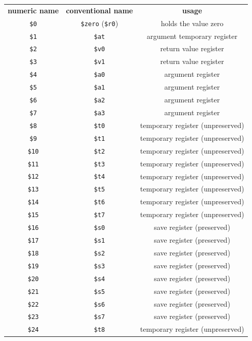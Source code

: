 \documentclass[12pt]{article}
\begin{document}
\begin{tabular}{c | c | c}
    \textbf{numeric name} & \textbf{conventional name} & \textbf{usage}\\
    \hhline{=|=|=}
    \texttt{\$0} & \texttt{\$zero} (\texttt{\$r0}) & holds the value zero \\ \hline
    \texttt{\$1} & \texttt{\$at} & argument temporary register \\ \hline
    \texttt{\$2} & \texttt{\$v0} & return value register \\ \hline
    \texttt{\$3} & \texttt{\$v1} & return value register \\ \hline
    \texttt{\$4} & \texttt{\$a0} & argument register \\ \hline
    \texttt{\$5} & \texttt{\$a1} & argument register \\ \hline
    \texttt{\$6} & \texttt{\$a2} & argument register \\ \hline
    \texttt{\$7} & \texttt{\$a3} & argument register \\ \hline
    \texttt{\$8} & \texttt{\$t0} & temporary register (unpreserved) \\ \hline
    \texttt{\$9} & \texttt{\$t1} & temporary register (unpreserved) \\ \hline
    \texttt{\$10} & \texttt{\$t2} & temporary register (unpreserved) \\ \hline
    \texttt{\$11} & \texttt{\$t3} & temporary register (unpreserved) \\ \hline
    \texttt{\$12} & \texttt{\$t4} & temporary register (unpreserved) \\ \hline
    \texttt{\$13} & \texttt{\$t5} & temporary register (unpreserved) \\ \hline
    \texttt{\$14} & \texttt{\$t6} & temporary register (unpreserved) \\ \hline
    \texttt{\$15} & \texttt{\$t7} & temporary register (unpreserved) \\ \hline
    \texttt{\$16} & \texttt{\$s0} & save register (preserved) \\ \hline
    \texttt{\$17} & \texttt{\$s1} & save register (preserved) \\ \hline
    \texttt{\$18} & \texttt{\$s2} & save register (preserved) \\ \hline
    \texttt{\$19} & \texttt{\$s3} & save register (preserved) \\ \hline
    \texttt{\$20} & \texttt{\$s4} & save register (preserved) \\ \hline
    \texttt{\$21} & \texttt{\$s5} & save register (preserved) \\ \hline
    \texttt{\$22} & \texttt{\$s6} & save register (preserved) \\ \hline
    \texttt{\$23} & \texttt{\$s7} & save register (preserved) \\ \hline
    \texttt{\$24} & \texttt{\$t8} & temporary register (unpreserved) \\ \hline
\end{tabular}\\
\end{document}

